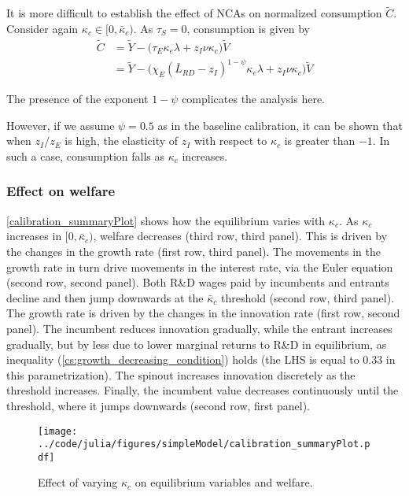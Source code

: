\documentclass[11pt,english]{article}
\theoremstyle{remark}
\begin{document}
It is more difficult to establish the effect of NCAs on normalized consumption $\tilde{C}$. Consider again $\kappa_c \in [0, \bar{\kappa}_c)$. As $\tau_S = 0$, consumption is given by 
\begin{align}
\tilde{C} &= \tilde{Y} - \Big( \tau_E  \kappa_e \lambda + z_I \nu \kappa_c \Big) \tilde{V} \\
&= \tilde{Y} - \Big( \chi_E (\bar{L}_{RD} - z_I)^{1-\psi} \kappa_e \lambda + z_I \nu \kappa_c \Big) \tilde{V} \label{cs:consumption_eq}
\end{align}

The presence of the exponent $1-\psi$ complicates the analysis here. 

However, if we assume $\psi = 0.5$ as in the baseline calibration, it can be shown that when $z_I / z_E$ is high, the elasticity of $z_I$ with respect to $\kappa_c$ is greater than $-1$. In such a case, consumption falls as $\kappa_c$ increases. 

\subsubsection{Effect on welfare}

\autoref{calibration_summaryPlot} shows how the equilibrium varies with $\kappa_c$. As $\kappa_c$ increases in $[0,\bar{\kappa}_c)$, welfare decreases (third row, third panel). This is driven by the changes in the growth rate (first row, third panel). The movements in the growth rate in turn drive movements in the interest rate, via the Euler equation (second row, second panel). Both R\&D wages paid by incumbents and entrants decline and then jump downwards at the $\bar{\kappa}_c$ threshold (second row, third panel). The growth rate is driven by the changes in the innovation rate (first row, second panel). The incumbent reduces innovation gradually, while the entrant increases gradually, but by less due to lower marginal returns to R\&D in equilibrium, as inequality (\ref{cs:growth_decreasing_condition}) holds (the LHS is equal to 0.33 in this parametrization). The spinout increases innovation discretely as the threshold increases. Finally, the incumbent value decreases continuously until the threshold, where it jumps downwards (second row, first panel).

\begin{figure}[]
	\texttt{[image: ../code/julia/figures/simpleModel/calibration\_summaryPlot.pdf]}
	\caption{Effect of varying $\kappa_c$ on equilibrium variables and welfare.}
	\label{calibration_summaryPlot}
\end{figure}
\end{document}

